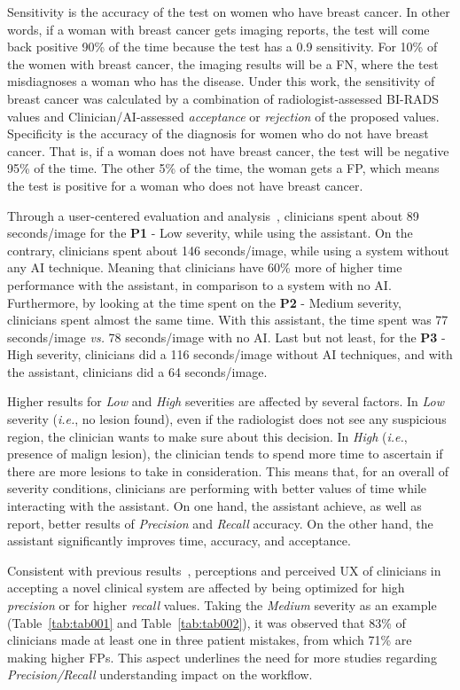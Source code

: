Sensitivity is the accuracy of the test on women who have breast cancer.
In other words, if a woman with breast cancer gets imaging reports, the test will come back positive 90\% of the time because the test has a 0.9 sensitivity.
For 10\% of the women with breast cancer, the imaging results will be a \ac{FN}, where the test misdiagnoses a woman who has the disease.
Under this work, the sensitivity of breast cancer was calculated by a combination of radiologist-assessed \ac{BI-RADS} values and Clinician/\ac{AI}-assessed {\it acceptance} or {\it rejection} of the proposed values.
Specificity is the accuracy of the diagnosis for women who do not have breast cancer.
That is, if a woman does not have breast cancer, the test will be negative 95\% of the time.
The other 5\% of the time, the woman gets a \ac{FP}, which means the test is positive for a woman who does not have breast cancer.

Through a user-centered evaluation and analysis~\cite{CALISTO2021102607}, clinicians spent about 89 seconds/image for the {\bf P1} - Low severity, while using the assistant.
On the contrary, clinicians spent about 146 seconds/image, while using a system without any \ac{AI} technique.
Meaning that clinicians have 60\% more of higher time performance with the assistant, in comparison to a system with no \ac{AI}.
Furthermore, by looking at the time spent on the {\bf P2} - Medium severity, clinicians spent almost the same time.
With this assistant, the time spent was 77 seconds/image {\it vs.} 78 seconds/image with no \ac{AI}.
Last but not least, for the {\bf P3} - High severity, clinicians did a 116 seconds/image without \ac{AI} techniques, and with the assistant, clinicians did a 64 seconds/image.

Higher results for {\it Low} and {\it High} severities are affected by several factors.
In {\it Low} severity ({\it i.e.}, no lesion found), even if the radiologist does not see any suspicious region, the clinician wants to make sure about this decision.
In {\it High} ({\it i.e.}, presence of malign lesion), the clinician tends to spend more time to ascertain if there are more lesions to take in consideration.
This means that, for an overall of severity conditions, clinicians are performing with better values of time while interacting with the assistant.
On one hand, the assistant achieve, as well as report, better results of {\it Precision} and {\it Recall} accuracy.
On the other hand, the assistant significantly improves time, accuracy, and acceptance.

Consistent with previous results~\cite{topol2019high}, perceptions and perceived \ac{UX} of clinicians in accepting a novel clinical system are affected by being optimized for high {\it precision} or for higher {\it recall} values.
Taking the {\it Medium} severity as an example (Table~\ref{tab:tab001} and Table~\ref{tab:tab002}), it was observed that 83\% of clinicians made at least one in three patient mistakes, from which 71\% are making higher \acp{FP}.
This aspect underlines the need for more studies regarding {\it Precision/Recall} understanding impact on the workflow.

